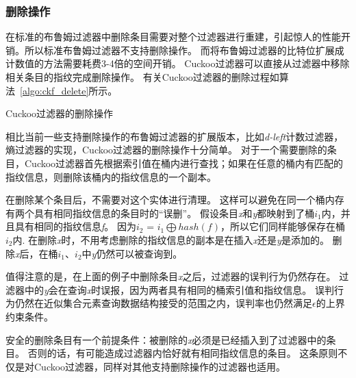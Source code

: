 \subsubsection{删除操作}
在标准的布鲁姆过滤器中删除条目需要对整个过滤器进行重建，引起惊人的性能开销。所以标准布鲁姆过滤器不支持删除操作。
而将布鲁姆过滤器的比特位扩展成计数值的方法需要耗费3-4倍的空间开销。
Cuckoo过滤器可以直接从过滤器中移除相关条目的指纹完成删除操作。
有关Cuckoo过滤器的删除过程如算法~\ref{algo:ckf_delete}所示。
\begin{algorithm}[htbp]
\SetAlgoLined
{}
\caption{Cuckoo过滤器的删除操作}
\label{algo:ckf_delete}
\end{algorithm}

相比当前一些支持删除操作的布鲁姆过滤器的扩展版本，比如\textit{d-left}计数过滤器，熵过滤器的实现，Cuckoo过滤器的删除操作十分简单。
对于一个需要删除的条目，Cuckoo过滤器首先根据索引值在桶内进行查找；如果在任意的桶内有匹配的指纹信息，则删除该桶内的指纹信息的一个副本。

在删除某个条目后，不需要对这个实体进行清理。
这样可以避免在同一个桶内存有两个具有相同指纹信息的条目时的“误删”。
假设条目\textit{x}和\textit{y}都映射到了桶$i_1$内，并且具有相同的指纹信息\textit{f}。
因为$i_2$ = $i_1\bigoplus hash(f)$，所以它们同样能够保存在桶$i_2$内.
在删除\textit{x}时，不用考虑删除的指纹信息的副本是在插入\textit{x}还是\textit{y}是添加的。
删除\textit{x}后，在桶$i_1$、$i_2$中\textit{y}仍然可以被查询到。

值得注意的是，在上面的例子中删除条目\textit{x}之后，过滤器的误判行为仍然存在。
过滤器中的\textit{y}会在查询\textit{x}时误报，因为两者具有相同的桶索引值和指纹信息。
误判行为仍然在近似集合元素查询数据结构接受的范围之内，误判率也仍然满足$\epsilon$的上界约束条件。

安全的删除条目有一个前提条件：被删除的\textit{x}必须是已经插入到了过滤器中的条目。
否则的话，有可能造成过滤器内恰好就有相同指纹信息的条目。
这条原则不仅是对Cuckoo过滤器，同样对其他支持删除操作的过滤器也适用。


